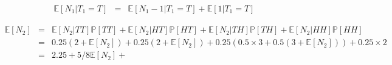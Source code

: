 \documentclass[11pt]{article}
\theoremstyle{definition}
\newcommand{\brac}[1]{\left(#1\right)}
\newcommand{\E}[1]{\mathbb{E}\left[#1\right]}
\newcommand{\prob}[1]{\mathbb{P}\left[#1\right]}
\begin{document}
	\begin{eqnarray}
	\E{N_1|T_1=T} &=& \E{N_1 - 1|T_1=T} + \E{1|T_1=T}
	\end{eqnarray}
	
	\begin{eqnarray*}
		\E{N_2} &=& \E{N_2|TT}\prob{TT} + \E{N_2|HT}\prob{HT} + \E{N_2|TH}\prob{TH} +\E{N_2|HH}\prob{HH}\\
		&=& 0.25\brac{2+\E{N_2}} + 0.25\brac{2+\E{N_2}} + 0.25\brac{0.5\times 3 + 0.5\brac{3+ \E{N_2}}} + 0.25\times 2\\
		&=& 2.25 + 5/8\E{N_2} + 
	\end{eqnarray*}
	
\end{document}
